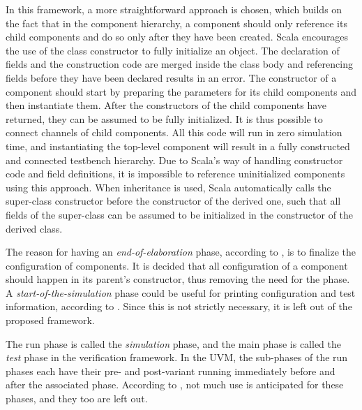 In this framework, a more straightforward approach is chosen, which builds on the fact that in the component hierarchy, a component
should only reference its child components and do so only after they have been created. Scala encourages the use of
the class constructor to fully initialize an object. The declaration of fields and the construction code are merged
inside the class body and referencing fields before they have been declared results in an error. The constructor of a
component should start by preparing the parameters for its child components and then instantiate them. After the
constructors of the child components have returned, they can be assumed to be fully initialized. It is thus possible to
connect channels of child components. All this
code will run in zero simulation time, and instantiating the top-level component will result in a fully constructed
and connected testbench hierarchy. Due to Scala's way of handling constructor code and field definitions, it is
impossible to reference uninitialized components using this approach. When inheritance is used, Scala automatically
calls the super-class constructor before the constructor of the derived one, such that all fields of the super-class can be
assumed to be initialized in the constructor of the derived class.

The reason for having an \textit{end-of-elaboration} phase, according to \cite[Ch 4.6]{mehta2018asic}, is to finalize
the configuration of components. It is decided that all configuration of a component should happen in its parent's constructor, thus removing the need for the phase. A \textit{start-of-the-simulation} phase could be useful for printing
configuration and test information, according to \cite[4.6]{mehta2018asic}. Since this is not strictly
necessary, it is left out of the proposed framework.

The run phase is called the \textit{simulation} phase, and the main phase is called the \textit{test} phase in the
verification framework. In the UVM, the sub-phases of the run phases each have their pre- and post-variant running
immediately before and
after the associated phase. According to \cite[Ch 4.6]{mehta2018asic}, not much use is anticipated for these phases, and they too are left out.

